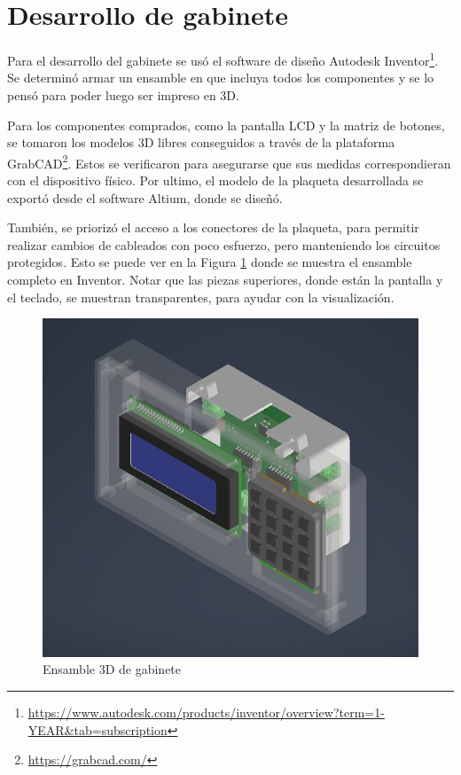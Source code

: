 \section{Desarrollo de gabinete}

Para el desarrollo del gabinete se usó el software de diseño Autodesk Inventor\footnote{\url{https://www.autodesk.com/products/inventor/overview?term=1-YEAR&tab=subscription}}. Se determinó armar un ensamble en que incluya todos los componentes y se lo pensó para poder luego ser impreso en 3D.

Para los componentes comprados, como la pantalla LCD y la matriz de botones, se tomaron los modelos 3D libres conseguidos a través de la plataforma GrabCAD\footnote{\url{https://grabcad.com/}}. Estos se verificaron para asegurarse que sus medidas correspondieran con el dispositivo físico. Por ultimo, el modelo de la plaqueta desarrollada se exportó desde el software Altium, donde se diseñó.

También, se priorizó el acceso a los conectores de la plaqueta, para permitir realizar cambios de cableados con poco esfuerzo, pero manteniendo los circuitos protegidos. Esto se puede ver en la Figura \ref{fig:ensamble} donde se muestra el ensamble completo en Inventor. Notar que las piezas superiores, donde están la pantalla y el teclado, se muestran transparentes, para ayudar con la visualización.

\begin{figure}[htbp]
	\centering
	\includegraphics[scale=.6]{./Figures/asm_3d.JPG}
	\caption{Ensamble 3D de gabinete}
	\label{fig:ensamble}
\end{figure}

